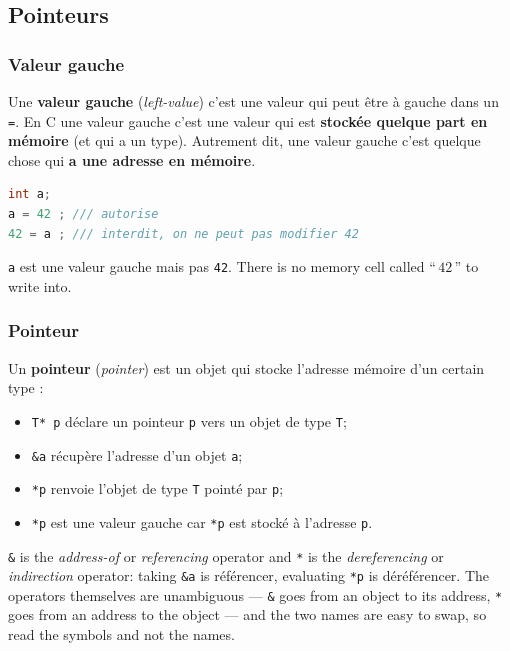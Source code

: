 \subsection{Pointeurs}
\subsubsection{Valeur gauche}
\begin{definition}
  Une \textbf{valeur gauche} (\textit{left-value}) c'est une valeur qui peut
  être à gauche dans un \verb|=|. En C une valeur gauche c'est une valeur qui
  est \textbf{stockée quelque part en mémoire} (et qui a un type). Autrement
  dit, une valeur gauche c'est quelque chose qui \textbf{a une adresse en
  mémoire}.
\end{definition}

\begin{lstlisting}[language=C]
int a;
a = 42 ; /// autorise
42 = a ; /// interdit, on ne peut pas modifier 42
\end{lstlisting}
\verb|a| est une valeur gauche mais pas \verb|42|. There is no memory cell
called ``\,$42$\,'' to write into.

\subsubsection{Pointeur}
\begin{definition}[Pointeur]
  Un \textbf{pointeur} (\textit{pointer}) est un objet qui stocke l'adresse
  mémoire d'un certain type :
  \begin{itemize}
    \item \verb|T* p| déclare un pointeur \verb|p| vers un objet de type \verb|T|;
    \item \verb|&a| récupère l'adresse d'un objet \verb|a|;
    \item \verb|*p| renvoie l'objet de type \verb|T| pointé par \verb|p|;
    \item \verb|*p| est une valeur gauche car \verb|*p| est stocké à
      l'adresse \verb|p|.
  \end{itemize}
\end{definition}

\begin{remark}
  \verb|&| is the \textit{address-of} or \textit{referencing} operator and
  \verb|*| is the \textit{dereferencing} or \textit{indirection} operator:
  taking \verb|&a| is référencer, evaluating \verb|*p| is déréférencer. The
  operators themselves are unambiguous --- \verb|&| goes from an object to its
  address, \verb|*| goes from an address to the object --- and the two names
  are easy to swap, so read the symbols and not the names.
\end{remark}

